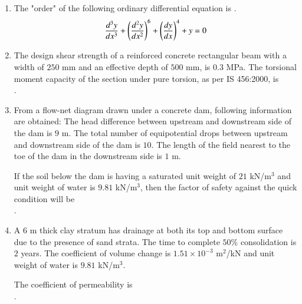 \documentclass[journal,12pt,onecolumn]{article}
\theoremstyle{remark}
\begin{document}
\begin{enumerate}
    \item The "order" of the following ordinary differential equation is \underline{\hspace{2cm}}.
    \begin{align} 
    \frac{d^3y}{dx^3} + \left(\frac{d^2y}{dx^2}\right)^6 + \left(\frac{dy}{dx}\right)^4 + y = 0 
    \end{align}
    
    \hfill{}

    \item The design shear strength of a reinforced concrete rectangular beam with a width of $250$ mm and an effective depth of $500$ mm, is $0.3$ MPa. The torsional moment capacity of the section  under pure torsion, as per IS 456:2000, is \underline{\hspace{2cm}} \\ .
    
    \hfill{}

    \item From a flow-net diagram drawn under a concrete dam, following information are obtained:  The head difference between upstream and downstream side of the dam is $9$ m.  The total number of equipotential drops between upstream and downstream side of the dam is $10$.  The length of the field nearest to the toe of the dam in the downstream side is $1$ m.
    
    If the soil below the dam is having a saturated unit weight of $21$ kN/m$^3$ and unit weight of water is $9.81$ kN/m$^3$, then the factor of safety against the quick condition will be \underline{\hspace{2cm}} \\ .
    
    \hfill{}

    \item A $6$ m thick clay stratum has drainage at both its top and bottom surface due to the presence of sand strata. The time to complete $50$\% consolidation is $2$ years. The coefficient of volume change  is $1.51 \times 10^{-3}$ m$^2$/kN and unit weight of water is $9.81$ kN/m$^3$.
    
    The coefficient of permeability  is \underline{\hspace{2cm}} \\
    .
    

\end{enumerate}
\end{document}
